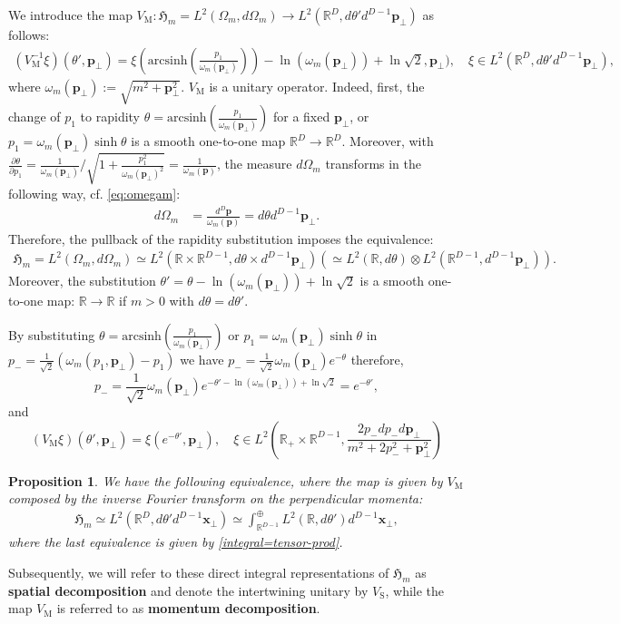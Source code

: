 \documentclass[12pt]{article}
\def\RR{{\mathbb R}}
\def\hm{\mathfrak{H}_m}
\def\arcsinh{\mathrm{arcsinh}}
\def\tp{\pmb{p}}
\newtheorem{proposition}[theorem]{Proposition}
\theoremstyle{remark}
\begin{document}
  We introduce the map $V_{\mathrm M}:\hm = L^2(\Omega_m,d\Omega_m) \to L^2(\RR^{D},d\theta'd^{D-1}\tp_\perp)$ as follows:
  \begin{align*}
  (V_{\mathrm M}^{-1}\xi)(\theta',\tp_\perp) = \textstyle{\xi(\mathrm{\arcsinh}(\frac{p_1}{\omega_m(\tp_\perp)}))-\ln(\omega_m(\tp_\perp))+\ln\sqrt 2, \tp_\perp)},\quad \xi\in L^2(\RR^D,d\theta'd^{D-1}\tp_\perp),
  \end{align*}
  where $\omega_m(\tp_\perp) := \sqrt{m^2 + \tp_\perp^2}$.
$  V_\mathrm{M}$ is a  unitary operator. Indeed, first,
  the change of $p_1$ to rapidity $\theta =\mathrm{\arcsinh}(\frac{p_1}{\omega_m(\tp_\perp)})$ for a fixed $\tp_\perp$, or
    $p_1 = \omega_m(\tp_\perp)\sinh \theta$ is a smooth one-to-one map $\RR^D\rightarrow \RR^D$.
    Moreover, with $\frac{\partial \theta}{\partial p_1} = \frac{1}{\omega_m(\tp_\perp)}/\sqrt{1+\frac{p_1^2}{\omega_m(\tp_\perp)^2}} = \frac1{\omega_m(\tp)}$, the measure $d\Omega_m$ transforms in the following way, cf.\! \eqref{eq:omegam}:
     \begin{align*}
      d\Omega_m&=\frac{d^{D}\tp}{\omega_m(\tp)}=d\theta d^{D-1}\tp_\perp.
     \end{align*}
    Therefore, the pullback of the rapidity substitution imposes the equivalence:
     \begin{align*}
      \hm=L^2(\Omega_m,d\Omega_m)\simeq L^2(\RR\times \RR^{D-1},d\theta \times d^{D-1}\tp_\perp) (\simeq L^2(\RR,d\theta)\otimes L^2(\RR^{D-1},d^{D-1}\tp_\perp)).
     \end{align*}
    Moreover, the substitution 
    $\theta'=\theta - \ln(\omega_m(\tp_\perp))+\ln\sqrt 2$ is a smooth one-to-one map: $\RR \rightarrow \RR$ if $m>0$ with $d\theta=d\theta'$.

 
By substituting $\theta = \arcsinh(\frac{p_1}{\omega_m(\tp_\perp)})$ or $p_1 = \omega_m(\tp_\perp)\sinh \theta$
in $p_- = \frac1{\sqrt 2}(\omega_m(p_1,\tp_\perp) - p_1)$
we have $p_-= \frac1{\sqrt 2}\omega_m(\tp_\perp)e^{-\theta}$
therefore, 
\[
p_-= \frac1{\sqrt 2}\omega_m(\tp_\perp)e^{-\theta'-\ln(\omega_m(\tp_\perp))+\ln\sqrt 2}=e^{-\theta'},
 \]
and 
\[
(V_{\mathrm M} \xi)(\theta',\tp_\perp)=\xi(e^{-\theta'}, \tp_\perp), \quad \xi\in L^2\left(\RR_+ \times \RR^{D-1}, \frac{2p_-dp_-d\tp_\perp}{m^2+2p_-^2+\tp_\perp^2}\right) 
\]

 \begin{proposition}
    We have the following equivalence, where the map is given by $V_{\mathrm M}$ composed by the inverse Fourier transform on
    the perpendicular momenta:
    \begin{align}\label{diagram-decompositions}
       \hm\simeq L^2(\RR^{D},d\theta'd^{D-1}\pmb{x}_\perp) \simeq \int_{\RR^{D-1}}^\oplus L^2(\RR,d\theta')d^{D-1}\pmb{x}_\perp,
     \end{align}
   where the last equivalence is given by \eqref{integral=tensor-prod}.
  \end{proposition}
Subsequently, we will refer to these direct integral representations of $\hm$ as \textbf{spatial decomposition}
and denote the intertwining unitary by $V_{\mathrm S}$,
while the map $V_{\mathrm M}$ is referred to as \textbf{momentum decomposition}.
\end{document}
